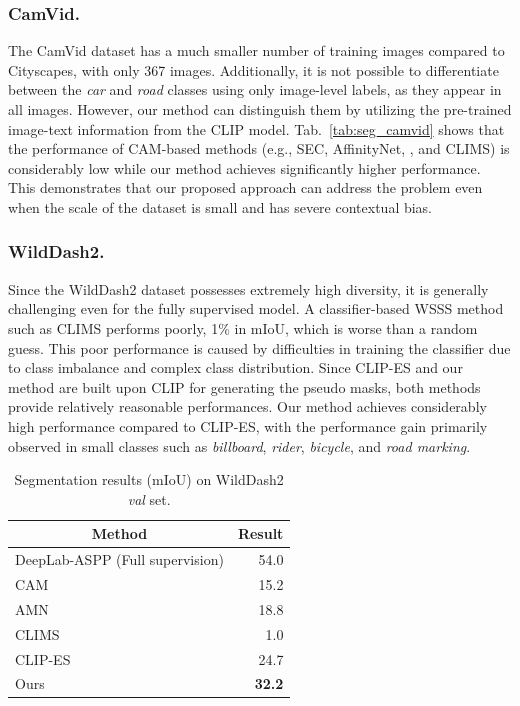 \documentclass[letterpaper]{article} %
\def\eg{e.g.} \def\Eg{E.g.}
\def\ie{i.e.} \def\Ie{I.e.}
\begin{document}
\subsubsection{CamVid.} The CamVid dataset has a much smaller number of training images compared to Cityscapes, with only 367 images. Additionally, it is not possible to differentiate between the \textit{car} and \textit{road} classes using only image-level labels, as they appear in all images. However, our method can distinguish them by utilizing the pre-trained image-text information from the CLIP model. Tab.~\ref{tab:seg_camvid} shows that the performance of CAM-based methods (\eg, SEC, AffinityNet, \citeauthor{wang2020deep}, and CLIMS) is considerably low while our method achieves significantly higher performance. This demonstrates that our proposed approach can address the problem even when the scale of the dataset is small and has severe contextual bias. %

\subsubsection{WildDash2.} Since the WildDash2 dataset possesses extremely high diversity, it is generally challenging even for the fully supervised model. A classifier-based WSSS method such as CLIMS performs poorly, 1\% in mIoU, which is worse than a random guess. This poor performance is caused by difficulties in training the classifier due to class imbalance and complex class distribution. Since CLIP-ES and our method are built upon CLIP for generating the pseudo masks, both methods provide relatively reasonable performances. Our method achieves considerably high performance compared to CLIP-ES, with the performance gain primarily observed in small classes such as \textit{billboard}, \textit{rider}, \textit{bicycle}, and \textit{road marking}.

\begin{table}[]
\centering
{\small
\begin{tabular}{@{}lr@{}}
\toprule
\multicolumn{1}{c}{Method}                              & \multicolumn{1}{c}{Result} \\ \midrule
\multicolumn{1}{l}{DeepLab-ASPP (Full supervision)}     & \multicolumn{1}{r}{54.0}          \\ \midrule
\multicolumn{1}{l}{CAM} & \multicolumn{1}{r}{15.2} \\
\multicolumn{1}{l}{AMN} & \multicolumn{1}{r}{18.8} \\
\multicolumn{1}{l}{CLIMS} & \multicolumn{1}{r}{1.0} \\
\multicolumn{1}{l}{CLIP-ES} & \multicolumn{1}{r}{24.7}          \\ \midrule
\multicolumn{1}{l}{Ours}                                & \multicolumn{1}{r}{\textbf{32.2}} \\ \bottomrule
\end{tabular}
}
\caption{Segmentation results (mIoU) on WildDash2 \textit{val} set.}
\label{tab:seg_coarse}
\end{table}
\end{document}
